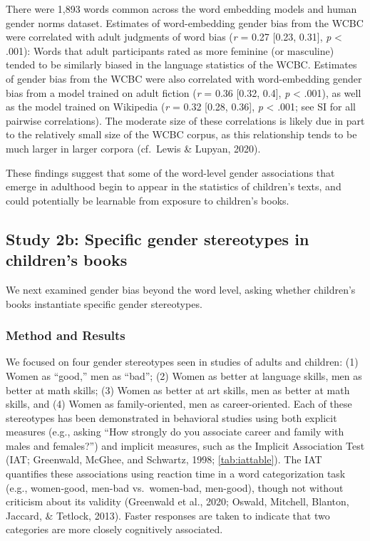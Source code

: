 \documentclass[
  english,
  ,man,floatsintext]{apa6}
\begin{document}
There were 1,893 words common across the word embedding models and human gender norms dataset. Estimates of word-embedding gender bias from the WCBC were correlated with adult judgments of word bias (\emph{r} = 0.27 {[}0.23, 0.31{]}, \emph{p} \textless{} .001): Words that adult participants rated as more feminine (or masculine) tended to be similarly biased in the language statistics of the WCBC. Estimates of gender bias from the WCBC were also correlated with word-embedding gender bias from a model trained on adult fiction (\emph{r} = 0.36 {[}0.32, 0.4{]}, \emph{p} \textless{} .001), as well as the model trained on Wikipedia (\emph{r} = 0.32 {[}0.28, 0.36{]}, \emph{p} \textless{} .001; see SI for all pairwise correlations). The moderate size of these correlations is likely due in part to the relatively small size of the WCBC corpus, as this relationship tends to be much larger in larger corpora (cf.~Lewis \& Lupyan, 2020).

These findings suggest that some of the word-level gender associations that emerge in adulthood begin to appear in the statistics of children's texts, and could potentially be learnable from exposure to children's books.

\hypertarget{study-2b-specific-gender-stereotypes-in-childrens-books}{%
\subsection{Study 2b: Specific gender stereotypes in children's books}\label{study-2b-specific-gender-stereotypes-in-childrens-books}}

We next examined gender bias beyond the word level, asking whether children's books instantiate specific gender stereotypes.

\hypertarget{method-and-results-2}{%
\subsubsection{Method and Results}\label{method-and-results-2}}

We focused on four gender stereotypes seen in studies of adults and children: (1) Women as ``good,'' men as ``bad''; (2) Women as better at language skills, men as better at math skills; (3) Women as better at art skills, men as better at math skills, and (4) Women as family-oriented, men as career-oriented. Each of these stereotypes has been demonstrated in behavioral studies using both explicit measures (e.g., asking ``How strongly do you associate career and family with males and females?'') and implicit measures, such as the Implicit Association Test (IAT; Greenwald, McGhee, and Schwartz, 1998; \autoref{tab:iattable}). The IAT quantifies these associations using reaction time in a word categorization task (e.g., women-good, men-bad vs.~women-bad, men-good), though not without criticism about its validity (Greenwald et al., 2020; Oswald, Mitchell, Blanton, Jaccard, \& Tetlock, 2013). Faster responses are taken to indicate that two categories are more closely cognitively associated.
\end{document}
